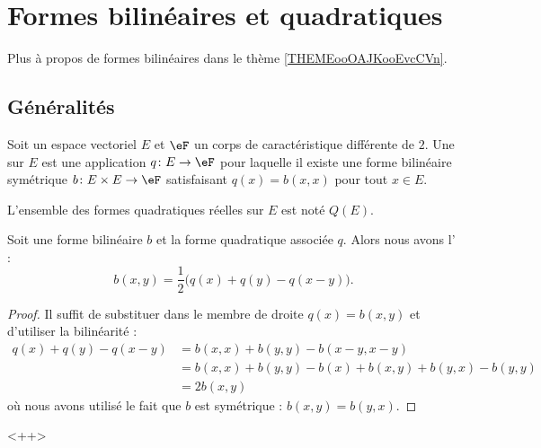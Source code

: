 \section{Formes bilinéaires et quadratiques}

Plus à propos de formes bilinéaires dans le thème \ref{THEMEooOAJKooEvcCVn}.

\subsection{Généralités}

\begin{definition}   \label{DefBSIoouvuKR}
    Soit un espace vectoriel \( E\) et \( \eF\) un corps de caractéristique différente de \( 2\). Une  sur \( E\) est une application \( q\colon E\to \eF\) pour laquelle il existe une forme bilinéaire symétrique \( b\colon E\times E\to \eF\) satisfaisant \( q(x)=b(x,x)\) pour tout \( x\in E\).

    L'ensemble des formes quadratiques réelles sur \( E\) est noté \( Q(E)\).
\end{definition}

\begin{proposition} \label{PROPooZLXVooOsXCcB}
    Soit une forme bilinéaire \( b\) et la forme quadratique associée \( q\). Alors nous avons l' :
    \begin{equation}    \label{EqMrbsop}
        b(x,y)=\frac{ 1 }{2}\big( q(x)+q(y)-q(x-y) \big).
    \end{equation}
\end{proposition}

\begin{proof}
    Il suffit de substituer dans le membre de droite \( q(x)=b(x,y)\) et d'utiliser la bilinéarité :
    \begin{subequations}
        \begin{align}
            q(x)+q(y)-q(x-y)&=b(x,x)+b(y,y)-b(x-y,x-y)\\
            &=b(x,x)+b(y,y)-b(x)+b(x,y)+b(y,x)-b(y,y)\\
            &=2b(x,y)
        \end{align}
    \end{subequations}
    où nous avons utilisé le fait que \( b\) est symétrique : \( b(x,y)=b(y,x)\).
\end{proof}
<++>

